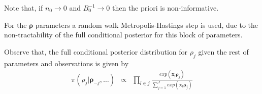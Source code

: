 \documentclass[11pt,letterpaper]{article}
\begin{document}
Note that, if $n_0\rightarrow 0$ and $B_0^{-1} \rightarrow 0$ then the priori is non-informative.

For the $\mathbf \rho$ parameters a random walk Metropolis-Hastings step is used, due to the non-tractability of the full conditional posterior for this block of parameters.

Observe that, the full conditional posterior distribution for $\rho_j$ given the rest of parameters and observations is given by
\begin{eqnarray*}
\pi (\rho_j| \mathbf \rho_{-j} , \ldots ) &\propto & \prod_{l \in j} \frac{exp(\mathbf x_l \mathbf \rho_j)}{\sum_{j =1}^J exp(\mathbf x_l \mathbf \rho_j)}
\end{eqnarray*}
\end{document}
